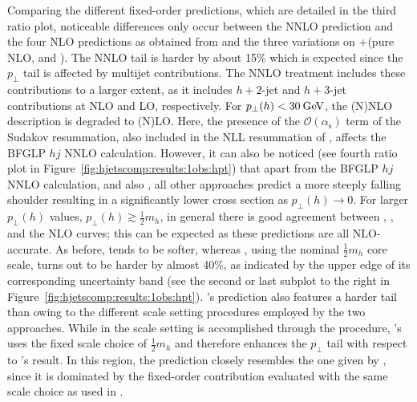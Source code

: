 Comparing the different fixed-order predictions, which are detailed in 
the third ratio plot, noticeable differences only
occur between the NNLO prediction and the four NLO predictions as
obtained from \Powheg and the three variations on \GoSam{}+\Sherpa (pure
NLO, \Minlo and \Loopsim). The NNLO tail is harder by about 15\% which
is expected since the $p_\perp$ tail is affected by multijet
contributions. The NNLO treatment includes these contributions to a
larger extent, as it includes $h+2$-jet and $h+3$-jet contributions at
 NLO and LO, respectively. For $p_\perp(h)<30\text{\:GeV}$, the (N)NLO
description is degraded to (N)LO. Here, the presence of the
$\mathcal{O}(\alpha_\mathrm{s})$ term of the Sudakov resummation, also
included in the NLL resummation of \Resbos, affects the BFGLP $hj$
NNLO calculation. However, it can also be noticed (see fourth ratio plot in
Figure~\ref{fig:hjetscomp:results:1obs:hpt}) that apart from the BFGLP
$hj$ NNLO calculation, \Resbos and also \Powheg, all other approaches
predict a more steeply falling shoulder resulting in a significantly
lower cross section as $p_\perp(h)\to0$.
For larger $p_\perp(h)$ values, $p_\perp(h)\gtrsim\tfrac{1}{2}m_h$, in
general there is good agreement between \Powheg, \MGaMC, \Sherpa
\MEPSatNLO and the NLO curves; this can be expected as these
predictions are all NLO-accurate. As before, \Herwig tends to be
softer, whereas \MGaMC, using the nominal $\tfrac{1}{2}m_h$ core scale,
turns out to be harder by almost 40\%, as indicated by the upper edge
of its corresponding uncertainty band (see the second or last subplot
to the right in Figure~\ref{fig:hjetscomp:results:1obs:hpt}). \Sherpa's
\NNLOPS prediction also features a harder tail than \Powheg owing to the
different scale setting procedures employed by the two approaches.
While in \Powheg the scale setting is accomplished through the \Minlo
procedure, \Sherpa's \NNLOPS uses the fixed scale choice of $\tfrac{1}{2}m_h$
and therefore enhances the $p_\perp$ tail with respect to \Powheg's
result. In this region, the \Resbos prediction closely resembles the
one given by \Sherpa \NNLOPS, since it is dominated by the fixed-order
contribution evaluated with the same scale choice as used in \Sherpa.

